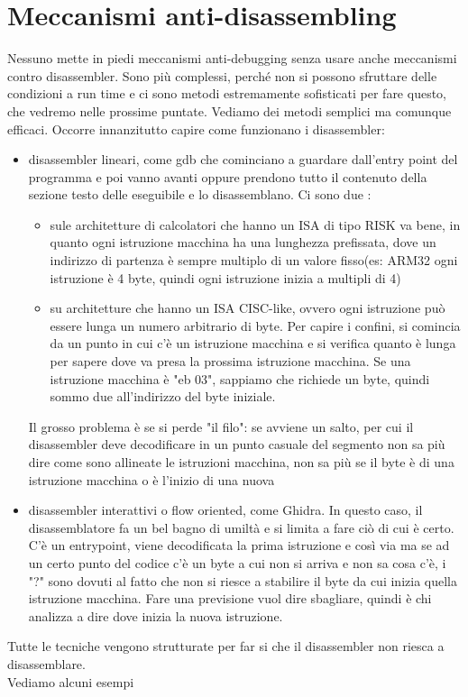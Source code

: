 \documentclass[12pt, oneside]{extbook}
\begin{document}
\section{Meccanismi anti-disassembling}
Nessuno mette in piedi meccanismi anti-debugging senza usare anche meccanismi contro disassembler. Sono più complessi, perché non si possono sfruttare delle condizioni a run time e ci sono metodi estremamente sofisticati per fare questo, che vedremo nelle prossime puntate. Vediamo dei metodi semplici ma comunque efficaci. Occorre innanzitutto capire come funzionano i disassembler:
\begin{itemize}
\item disassembler lineari, come gdb che cominciano a guardare dall'entry point del programma e poi vanno avanti oppure prendono tutto il contenuto della sezione testo delle eseguibile e lo disassemblano. Ci sono due :
\begin{itemize}
\item sule architetture di calcolatori che hanno un ISA di tipo RISK va bene, in quanto ogni istruzione macchina ha una lunghezza prefissata, dove un indirizzo di partenza è sempre multiplo di un valore fisso(es: ARM32 ogni istruzione è 4 byte, quindi ogni istruzione inizia a multipli di 4)
\item su architetture che hanno un ISA CISC-like, ovvero ogni istruzione può essere lunga un numero arbitrario di byte. Per capire i confini, si comincia da un punto in cui c'è un istruzione macchina e si verifica quanto è lunga per sapere dove va presa la prossima istruzione macchina. Se una istruzione macchina è "eb 03", sappiamo che richiede un byte, quindi sommo due all'indirizzo del byte iniziale.
\end{itemize}
Il grosso problema è se si perde "il filo": se avviene un salto, per cui il disassembler deve decodificare in un punto casuale del segmento non sa più dire come sono allineate le istruzioni macchina, non sa più se il byte è di una istruzione macchina o è l'inizio di una nuova
\item disassembler interattivi o flow oriented, come Ghidra. In questo caso, il disassemblatore fa un bel bagno di umiltà e si limita a fare ciò di cui è certo. C'è un entrypoint, viene decodificata la prima istruzione e così via ma se ad un certo punto del codice c'è un byte a cui non si arriva e non sa cosa c'è, i "?" sono dovuti al fatto che non si riesce a stabilire il byte da cui inizia quella istruzione macchina. Fare una previsione vuol dire sbagliare, quindi è chi analizza a dire dove inizia la nuova istruzione.
\end{itemize}
Tutte le tecniche vengono strutturate per far si che il disassembler non riesca a disassemblare.\\Vediamo alcuni esempi
\end{document}
